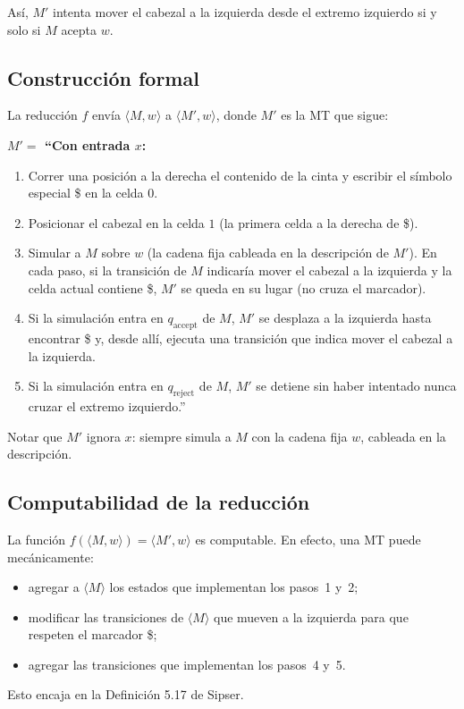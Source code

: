 \documentclass[11pt,a4paper]{article}
\theoremstyle{plain}
\theoremstyle{definition}
\theoremstyle{remark}
\newcommand{\enc}[1]{\langle #1\rangle}
\newcommand{\encMw}{\langle M, w\rangle}
\newcommand{\qaccept}{q_{\text{accept}}}
\newcommand{\qreject}{q_{\text{reject}}}
\begin{document}
As\'i, $M'$ intenta mover el cabezal a la izquierda desde el extremo
izquierdo si y solo si $M$ acepta $w$.

\subsection*{Construcci\'on formal}

La reducci\'on $f$ env\'ia $\encMw$ a $\enc{M', w}$, donde $M'$ es la
MT que sigue:

\medskip\noindent\textbf{$M'=$ ``Con entrada $x$:}
\begin{enumerate}
  \item Correr una posici\'on a la derecha el contenido de la cinta y
        escribir el s\'imbolo especial \$ en la celda $0$.
  \item Posicionar el cabezal en la celda $1$ (la primera celda a la
        derecha de \$).
  \item Simular a $M$ sobre $w$ (la cadena fija cableada en la
        descripci\'on de $M'$). En cada paso, si la transici\'on de $M$
        indicar\'ia mover el cabezal a la izquierda y la celda actual
        contiene \$, $M'$ se queda en su lugar (no cruza el marcador).
  \item Si la simulaci\'on entra en $\qaccept$ de $M$, $M'$ se
        desplaza a la izquierda hasta encontrar \$ y, desde all\'i,
        ejecuta una transici\'on que indica mover el cabezal a la
        izquierda.
  \item Si la simulaci\'on entra en $\qreject$ de $M$, $M'$ se detiene
        sin haber intentado nunca cruzar el extremo izquierdo.''
\end{enumerate}
\medskip

Notar que $M'$ ignora $x$: siempre simula a $M$ con la cadena fija $w$,
cableada en la descripci\'on.

\subsection*{Computabilidad de la reducci\'on}

La funci\'on $f(\encMw) = \enc{M', w}$ es computable. En efecto, una
MT puede mec\'anicamente:
\begin{itemize}
  \item agregar a $\enc{M}$ los estados que implementan los pasos~1 y~2;
  \item modificar las transiciones de $\enc{M}$ que mueven a la
        izquierda para que respeten el marcador \$;
  \item agregar las transiciones que implementan los pasos~4 y~5.
\end{itemize}
Esto encaja en la Definici\'on 5.17 de Sipser.
\end{document}
